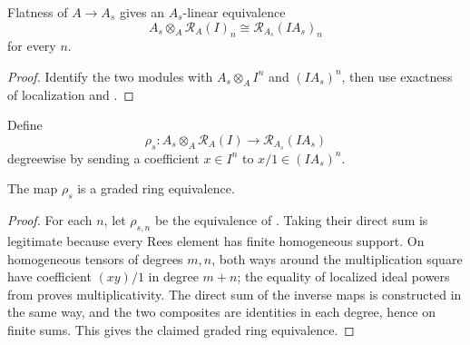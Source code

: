 \begin{lemma}
  \label{lemma:nagata-localization-rees-piece}

  Flatness of $A\to A_s$ gives an $A_s$-linear equivalence
  \[
    A_s\otimes_A\mathcal R_A(I)_n
      \cong\mathcal R_{A_s}(IA_s)_n
  \]
  for every $n$.
\end{lemma}

\begin{proof}
  Identify the two modules with
  $A_s\otimes_AI^n$ and $(IA_s)^n$, then use exactness of localization and
  .
\end{proof}

\begin{definition}
  \label{def:nagata-rees-localization-map}
  \leanok

  Define
  \[
    \rho_s\colon A_s\otimes_A\mathcal R_A(I)
      \longrightarrow\mathcal R_{A_s}(IA_s)
  \]
  degreewise by sending a coefficient $x\in I^n$ to $x/1\in(IA_s)^n$.
\end{definition}

\begin{proposition}
  \label{prop:nagata-rees-localization}
  \leanok

  The map $\rho_s$ is a graded ring equivalence.
\end{proposition}

\begin{proof}
  \leanok
  For each $n$, let $\rho_{s,n}$ be the equivalence of
  .  Taking their direct sum is
  legitimate because every Rees element has finite homogeneous support.  On
  homogeneous tensors of degrees $m,n$, both ways around the multiplication
  square have coefficient $(xy)/1$ in degree $m+n$; the equality of localized
  ideal powers from  proves
  multiplicativity.  The direct sum of the inverse maps is constructed in
  the same way, and the two composites are identities in each degree, hence
  on finite sums.  This gives the claimed graded ring equivalence.
\end{proof}

